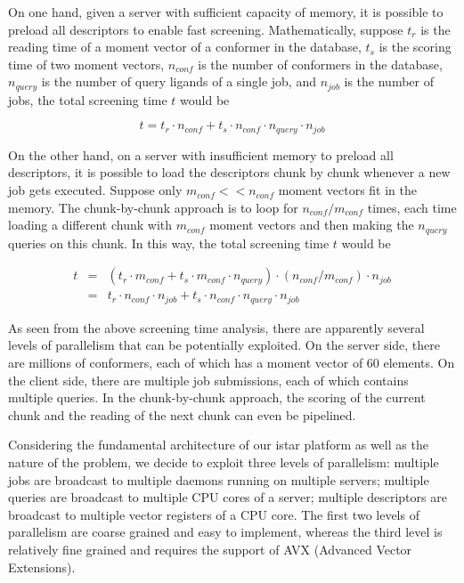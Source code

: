 On one hand, given a server with sufficient capacity of memory, it is possible to preload all descriptors to enable fast screening. Mathematically, suppose $t_r$ is the reading time of a moment vector of a conformer in the database, $t_s$ is the scoring time of two moment vectors, $n_{conf}$ is the number of conformers in the database, $n_{query}$ is the number of query ligands of a single job, and $n_{job}$ is the number of jobs, the total screening time $t$ would be

\begin{equation}
t=t_r\cdot n_{conf}+t_s\cdot n_{conf}\cdot n_{query}\cdot n_{job}
\label{usr:time0}
\end{equation}

On the other hand, on a server with insufficient memory to preload all descriptors, it is possible to load the descriptors chunk by chunk whenever a new job gets executed. Suppose only $m_{conf} << n_{conf}$ moment vectors fit in the memory. The chunk-by-chunk approach is to loop for $n_{conf}/m_{conf}$ times, each time loading a different chunk with $m_{conf}$ moment vectors and then making the $n_{query}$ queries on this chunk. In this way, the total screening time $t$ would be

\begin{eqnarray}
t&=&(t_r\cdot m_{conf}+t_s\cdot m_{conf}\cdot n_{query})\cdot(n_{conf}/m_{conf})\cdot n_{job}\nonumber\\
 &=&t_r\cdot n_{conf}\cdot n_{job}+t_s\cdot n_{conf}\cdot n_{query}\cdot n_{job}
\label{usr:time1}
\end{eqnarray}

As seen from the above screening time analysis, there are apparently several levels of parallelism that can be potentially exploited. On the server side, there are millions of conformers, each of which has a moment vector of 60 elements. On the client side, there are multiple job submissions, each of which contains multiple queries. In the chunk-by-chunk approach, the scoring of the current chunk and the reading of the next chunk can even be pipelined.

Considering the fundamental architecture of our istar platform \citep{1362} as well as the nature of the problem, we decide to exploit three levels of parallelism: multiple jobs are broadcast to multiple daemons running on multiple servers; multiple queries are broadcast to multiple CPU cores of a server; multiple descriptors are broadcast to multiple vector registers of a CPU core. The first two levels of parallelism are coarse grained and easy to implement, whereas the third level is relatively fine grained and requires the support of AVX (Advanced Vector Extensions).

